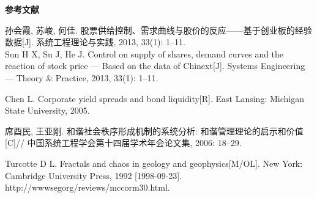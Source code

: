 \documentclass[twoside]{cctart}
\def\sz{\small \zihao{-5}}
\def\REFERENCE{\vspace*{.2in}
{\noindent\bf\heiti\zihao{5}参考文献} \vspace*{.1in}}
\begin{document}
\vspace{2mm}\begin{center}
\end{center}\vspace{2mm}



\REFERENCE

{\small \baselineskip 12pt




\REF{[1]}
孙会霞, 苏峻, 何佳.
股票供给控制、需求曲线与股价的反应------基于创业板的经验数据[J].
系统工程理论与实践, 2013, 33(1): 1--11. \\
Sun H X, Su J, He J. Control on supply of shares, demand curves
and the reaction of stock price --- Based on the data of
Chinext[J]. Systems Engineering --- Theory \& Practice, 2013,
33(1): 1--11.%

\REF{[2]} Chen L. Corporate yield spreads and bond liquidity[R]. East Lansing: Michigan State University, 2005. %

\REF{[3]} 席酉民, 王亚刚. 和谐社会秩序形成机制的系统分析:
和谐管理理论的启示和价值[C]//
中国系统工程学会第十四届学术年会论文集, 2006: 18--29.%

\REF{[4]} Turcotte D L. Fractals and chaos in geology and
geophysics[M/OL]. New York: Cambridge University Press, 1992
[1998-09-23]. http://wwwsegorg/reviews/mccorm30.html.%

}
\end{document}
